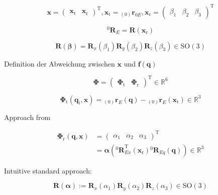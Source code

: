 \documentclass[twocolumn,10pt]{IFTOMM}
\newcommand{\bm}[1]{\boldsymbol{#1}}
\newcommand{\ortvek}[4]{{ }_{(#1)}{\boldsymbol{#2}}^{#3}_{#4} }
\newcommand{\rotmat}[2]{{{ }^{#1}\boldsymbol{R}}_{#2}}
\newcommand{\transp}[0]{{\mathrm{T}}}
\begin{document}
\begin{equation}
\bm{x}
=
\begin{pmatrix}
\bm{x}_{\mathrm{t}} & \bm{x}_{\mathrm{r}}
\end{pmatrix}^\transp
, 
\bm{x}_{\mathrm{t}}
=
\ortvek{0}{r}{}{0E}
,
\bm{x}_{\mathrm{r}}
=
\begin{pmatrix}
\beta_1  & \beta_2 & \beta_3
\end{pmatrix}^{\mathrm{T}}
\end{equation}  


\begin{equation}
\rotmat{0}{E}=\bm{R}(\bm{x}_{\mathrm{r}})
\end{equation}  


\begin{equation}
\bm{R}(\bm{\beta}) = \bm{R}_x(\beta_1) \bm{R}_y(\beta_2) \bm{R}_z(\beta_3) \in \mathrm{SO(3)}
\end{equation}

Definition der Abweichung zwischen $\bm{x}$ und $\bm{f}(\bm{q})$

\begin{equation}
\bm{\Phi}=\begin{pmatrix}
\bm{\Phi}_{\mathrm{t}} & \bm{\Phi}_{\mathrm{r}}
\end{pmatrix}^\transp \in {\mathbb{R}}^{6}
\end{equation}

\begin{equation}
\bm{\Phi}_{\mathrm{t}}(\bm{q}_i,\bm{x}) = \ortvek{0}{r}{}{E}(\bm{q}) - \ortvek{0}{r}{}{E}(\bm{x}_{\mathrm{t}}) \in {\mathbb{R}}^{3}
\end{equation}

Approach from \cite{GoldenbergBenFen1985}

\begin{align}
\bm{\Phi}_{\mathrm{r}}(\bm{q},\bm{x}) &= \begin{pmatrix}
\alpha_1  & \alpha_2 & \alpha_3
\end{pmatrix}^\transp  \\
&=\bm{\alpha}\left(\rotmat{0}{Ex}^\transp (\bm{x}_{\mathrm{r}})\rotmat{0}{Eq}(\bm{q})\right) \in {\mathbb{R}}^{3}
\end{align}


Intuitive standard approach:

\begin{equation}
\bm{R}(\bm{\alpha}) := \bm{R}_x(\alpha_1) \bm{R}_y(\alpha_2) \bm{R}_z(\alpha_3) \in \mathrm{SO(3)}
\end{equation}
\end{document}
